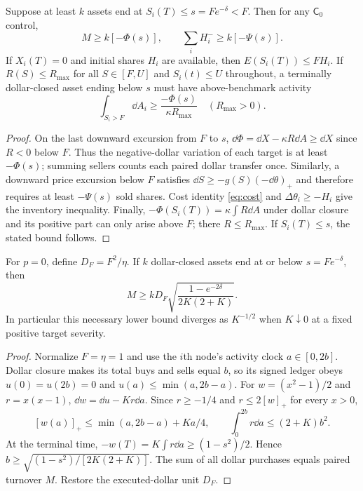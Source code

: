 \documentclass[review,hidelinks,onefignum,onetabnum]{siamonline250211}%
\begin{document}
\begin{theorem}\label{thm:lower}
Suppose at least $k$ assets end at $S_i(T)\le s=Fe^{-\delta}<F$.
Then for any $\mathsf C_0$ control,
\begin{equation}\label{eq:bounds}
 M\ge k[-\Phi(s)],\qquad
 \sum_iH_i^-\ge k[-\Psi(s)].
\end{equation}
If $X_i(T)=0$ and initial shares $H_i$ are available, then
$E(S_i(T))\le F H_i$. If $R(S)\le R_{\max}$ for all $S\in[F,U]$
and $S_i(t)\le U$ throughout, a terminally dollar-closed asset ending
below $s$ must have above-benchmark activity
\begin{equation}\label{eq:above}
 \int_{S_i>F}\dd A_i\ge\frac{-\Phi(s)}{\kappa R_{\max}}
 \quad (R_{\max}>0).
\end{equation}
\end{theorem}
\begin{proof}
On the last downward excursion from $F$ to $s$,
$\dd\Phi=\dd X-\kappa R\dd A\ge\dd X$ since $R<0$ below $F$.
Thus the negative-dollar variation of each target is at least
$-\Phi(s)$; summing sellers counts each paired dollar transfer once.
Similarly, a downward price excursion below $F$ satisfies
$\dd S\ge-g(S)(-\dd\theta)_+$ and therefore requires at least
$-\Psi(s)$ sold shares. Cost identity \eqref{eq:cost} and
$\Delta\theta_i\ge-H_i$ give the inventory inequality.
Finally, $-\Phi(S_i(T))=\kappa\int R\dd A$
under dollar closure and its positive part can only arise above $F$;
there $R\le R_{\max}$. If $S_i(T)\le s$, the stated bound follows.
\end{proof}

\begin{theorem}\label{thm:kresource}
For $p=0$, define $D_F=F^2/\eta$. If $k$ dollar-closed assets
end at or below $s=Fe^{-\delta}$, then
\begin{equation}\label{eq:Kbound}
 M\ge kD_F\sqrt{\frac{1-e^{-2\delta}}{2K(2+K)}}.
\end{equation}
In particular this necessary lower bound diverges as $K^{-1/2}$
when $K\downarrow0$ at a fixed positive target severity.
\end{theorem}
\begin{proof}
Normalize $F=\eta=1$ and use the $i$th node's activity clock
$a\in[0,2b]$. Dollar closure makes its total buys and sells equal $b$,
so its signed ledger obeys $u(0)=u(2b)=0$ and
$u(a)\le\min(a,2b-a)$. For $w=(x^2-1)/2$ and $r=x(x-1)$,
$\dd w=\dd u-Kr\dd a$. Since $r\ge-1/4$ and
$r\le2[w]_+$ for every $x>0$,
\[
 [w(a)]_+\le\min(a,2b-a)+Ka/4,
 \qquad \int_0^{2b}r\dd a\le(2+K)b^2.
\]
At the terminal time, $-w(T)=K\int r\dd a\ge(1-s^2)/2$.
Hence $b\ge\sqrt{(1-s^2)/[2K(2+K)]}$.
The sum of all dollar purchases equals paired turnover $M$.
Restore the executed-dollar unit $D_F$.
\end{proof}
\end{document}

